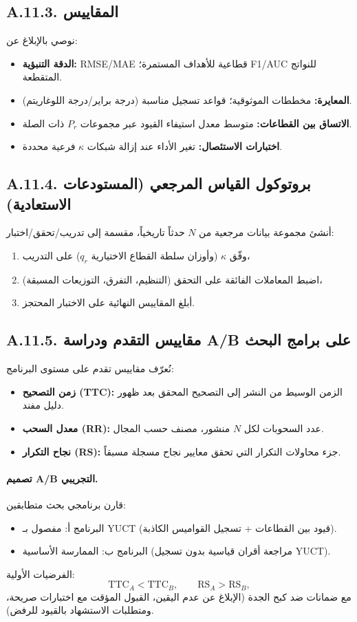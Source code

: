 \documentclass[13pt,a4paper]{article}
\begin{document}
	\subsection*{A.11.3. المقاييس}
	نوصي بالإبلاغ عن:
	\begin{itemize}[leftmargin=*]
		\item \textbf{الدقة التنبؤية:} RMSE/MAE قطاعية للأهداف المستمرة؛ F1/AUC للنواتج المتقطعة.
		\item \textbf{المعايرة:} مخططات الموثوقية؛ قواعد تسجيل مناسبة (درجة براير/درجة اللوغاريتم).
		\item \textbf{الاتساق بين القطاعات:} متوسط معدل استيفاء القيود عبر مجموعات $P_r$ ذات الصلة.
		\item \textbf{اختبارات الاستئصال:} تغير الأداء عند إزالة شبكات $\kappa$ فرعية محددة.
	\end{itemize}
	
	\subsection*{A.11.4. بروتوكول القياس المرجعي (المستودعات الاستعادية)}
	أنشئ مجموعة بيانات مرجعية من $N$ حدثاً تاريخياً، مقسمة إلى تدريب/تحقق/اختبار:
	\begin{enumerate}[leftmargin=*]
		\item وفّق $\kappa$ (وأوزان سلطة القطاع الاختيارية $q_r$) على التدريب،
		\item اضبط المعاملات الفائقة على التحقق (التنظيم، التفرق، التوزيعات المسبقة)،
		\item أبلغ المقاييس النهائية على الاختبار المحتجز.
	\end{enumerate}
	
	\subsection*{A.11.5. مقاييس التقدم ودراسة A/B على برامج البحث}
	نُعرّف مقاييس تقدم على مستوى البرنامج:
	\begin{itemize}[leftmargin=*]
		\item \textbf{زمن التصحيح (TTC):} الزمن الوسيط من النشر إلى التصحيح المحقق بعد ظهور دليل مفند.
		\item \textbf{معدل السحب (RR):} عدد السحوبات لكل $N$ منشور، مصنف حسب المجال.
		\item \textbf{نجاح التكرار (RS):} جزء محاولات التكرار التي تحقق معايير نجاح مسجلة مسبقاً.
	\end{itemize}
	
	\paragraph{تصميم A/B التجريبي.}
	قارن برنامجي بحث متطابقين:
	\begin{itemize}[leftmargin=*]
		\item البرنامج أ: مفصول بـ YUCT (قيود بين القطاعات + تسجيل القواميس الكاذبة).
		\item البرنامج ب: الممارسة الأساسية (مراجعة أقران قياسية بدون تسجيل YUCT).
	\end{itemize}
	الفرضيات الأولية:
	$$
	\mathrm{TTC}_A < \mathrm{TTC}_B,\qquad \mathrm{RS}_A > \mathrm{RS}_B,
	$$
	مع ضمانات ضد كبح الجدة (الإبلاغ عن عدم اليقين، القبول المؤقت مع اختبارات صريحة، ومتطلبات الاستشهاد بالقيود للرفض).
	
\end{document}
